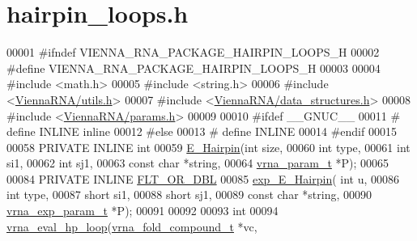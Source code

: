 \hypertarget{hairpin__loops_8h_source}{}\section{hairpin\+\_\+loops.\+h}
\label{hairpin__loops_8h_source}

\begin{DoxyCode}
00001 \textcolor{preprocessor}{#ifndef VIENNA\_RNA\_PACKAGE\_HAIRPIN\_LOOPS\_H}
00002 \textcolor{preprocessor}{#define VIENNA\_RNA\_PACKAGE\_HAIRPIN\_LOOPS\_H}
00003 
00004 \textcolor{preprocessor}{#include <math.h>}
00005 \textcolor{preprocessor}{#include <string.h>}
00006 \textcolor{preprocessor}{#include <\hyperlink{utils_8h}{ViennaRNA/utils.h}>}
00007 \textcolor{preprocessor}{#include <\hyperlink{data__structures_8h}{ViennaRNA/data\_structures.h}>}
00008 \textcolor{preprocessor}{#include <\hyperlink{params_8h}{ViennaRNA/params.h}>}
00009 
00010 \textcolor{preprocessor}{#ifdef \_\_GNUC\_\_}
00011 \textcolor{preprocessor}{# define INLINE inline}
00012 \textcolor{preprocessor}{#else}
00013 \textcolor{preprocessor}{# define INLINE}
00014 \textcolor{preprocessor}{#endif}
00015 
00058 PRIVATE INLINE \textcolor{keywordtype}{int}
00059 \hyperlink{group__loops_gadf943ee9a45b7f4cee9192c06210dace}{E\_Hairpin}(\textcolor{keywordtype}{int} size,
00060               \textcolor{keywordtype}{int} type,
00061               \textcolor{keywordtype}{int} si1,
00062               \textcolor{keywordtype}{int} sj1,
00063               \textcolor{keyword}{const} \textcolor{keywordtype}{char} *\textcolor{keywordtype}{string},
00064               \hyperlink{group__energy__parameters_structvrna__param__s}{vrna\_param\_t} *P);
00065 
00084 PRIVATE INLINE \hyperlink{group__data__structures_ga31125aeace516926bf7f251f759b6126}{FLT\_OR\_DBL}
00085 \hyperlink{group__loops_ga51fb555974f180b78d76142b2894851c}{exp\_E\_Hairpin}(  \textcolor{keywordtype}{int} u,
00086                 \textcolor{keywordtype}{int} type,
00087                 \textcolor{keywordtype}{short} si1,
00088                 \textcolor{keywordtype}{short} sj1,
00089                 \textcolor{keyword}{const} \textcolor{keywordtype}{char} *\textcolor{keywordtype}{string},
00090                 \hyperlink{group__energy__parameters_structvrna__exp__param__s}{vrna\_exp\_param\_t} *P);
00091 
00092 
00093 \textcolor{keywordtype}{int}
00094 \hyperlink{group__eval_gab3eb4651dc26dc2b653a57dd340d7e68}{vrna\_eval\_hp\_loop}(\hyperlink{group__fold__compound_structvrna__fc__s}{vrna\_fold\_compound\_t} *vc,

\end{DoxyCode}

